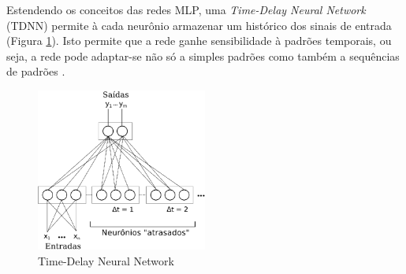 Estendendo os conceitos das redes MLP, uma \textit{Time-Delay Neural Network} (TDNN) permite à cada neurônio armazenar um histórico dos sinais de entrada (Figura \ref{fig:tdnn}). Isto permite que a rede ganhe sensibilidade à padrões temporais, ou seja, a rede pode adaptar-se não só a simples padrões como também a sequências de padrões \cite{kaiser1994tdnn}.

\begin{figure}[H]
    \centering
    \includegraphics[width=0.5\textwidth]{figures/tdnn}
    \caption{Time-Delay Neural Network}
    \label{fig:tdnn}
\end{figure}